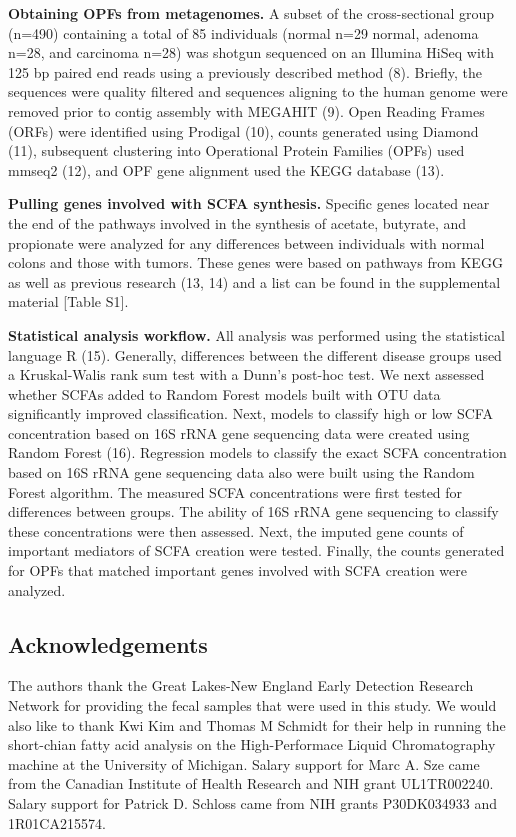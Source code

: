 \documentclass[11pt,]{article}
\begin{document}
\textbf{Obtaining OPFs from metagenomes.} A subset of the
cross-sectional group (n=490) containing a total of 85 individuals
(normal n=29 normal, adenoma n=28, and carcinoma n=28) was shotgun
sequenced on an Illumina HiSeq with 125 bp paired end reads using a
previously described method (8). Briefly, the sequences were quality
filtered and sequences aligning to the human genome were removed prior
to contig assembly with MEGAHIT (9). Open Reading Frames (ORFs) were
identified using Prodigal (10), counts generated using Diamond (11),
subsequent clustering into Operational Protein Families (OPFs) used
mmseq2 (12), and OPF gene alignment used the KEGG database (13).

\textbf{Pulling genes involved with SCFA synthesis.} Specific genes
located near the end of the pathways involved in the synthesis of
acetate, butyrate, and propionate were analyzed for any differences
between individuals with normal colons and those with tumors. These
genes were based on pathways from KEGG as well as previous research (13,
14) and a list can be found in the supplemental material {[}Table S1{]}.

\textbf{Statistical analysis workflow.} All analysis was performed using
the statistical language R (15). Generally, differences between the
different disease groups used a Kruskal-Walis rank sum test with a
Dunn's post-hoc test. We next assessed whether SCFAs added to Random
Forest models built with OTU data significantly improved classification.
Next, models to classify high or low SCFA concentration based on 16S
rRNA gene sequencing data were created using Random Forest (16).
Regression models to classify the exact SCFA concentration based on 16S
rRNA gene sequencing data also were built using the Random Forest
algorithm. The measured SCFA concentrations were first tested for
differences between groups. The ability of 16S rRNA gene sequencing to
classify these concentrations were then assessed. Next, the imputed gene
counts of important mediators of SCFA creation were tested. Finally, the
counts generated for OPFs that matched important genes involved with
SCFA creation were analyzed.

\newpage

\subsection{Acknowledgements}\label{acknowledgements}

The authors thank the Great Lakes-New England Early Detection Research
Network for providing the fecal samples that were used in this study. We
would also like to thank Kwi Kim and Thomas M Schmidt for their help in
running the short-chian fatty acid analysis on the High-Performace
Liquid Chromatography machine at the University of Michigan. Salary
support for Marc A. Sze came from the Canadian Institute of Health
Research and NIH grant UL1TR002240. Salary support for Patrick D.
Schloss came from NIH grants P30DK034933 and 1R01CA215574.
\end{document}

